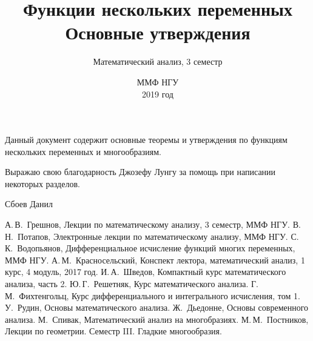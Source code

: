 \documentclass[oneside, final]{book}
\title{\textbf{Функции нескольких переменных}\\ Основные утверждения}
\author{Математический анализ, 3 семестр}
\date{ММФ НГУ\\ \vfill2019 год}
\theoremstyle{plain}
\theoremstyle{definition}
\begin{document}
	\maketitle
	
	\thispagestyle{empty}
	\vfill 
		Данный документ содержит основные теоремы и утверждения по функциям нескольких переменных и многообразиям.
		
		Выражаю свою благодарность Джозефу Лунгу за помощь при написании некоторых разделов.
		
	\vfill
	\hfill Сбоев Данил
	\vfill
	\newpage
	\thispagestyle{empty}
	\tableofcontents
	
	

	
		
	
	
	\begin{thebibliography}{0}
		 А.\,В.~Грешнов, Лекции по математическому анализу, 3 семестр, ММФ НГУ.
		 В.\,Н.~Потапов, Электронные лекции по математическому анализу, ММФ НГУ.
		 С.\,К.~Водопьянов, Дифференциальное исчисление функций многих переменных, ММФ НГУ.
		 А.\,М.~Красносельский, Конспект лектора, математический анализ, 1 курс, 4 модуль, 2017 год. 
		 И.\,А.~Шведов, Компактный курс математического анализа, часть 2.
		 Ю.\,Г.~Решетняк, Курс математического анализа.
		 Г.\,М.~Фихтенгольц, Курс дифференциального и интегрального исчисления, том 1.
		 У.~Рудин, Основы математического анализа.
		 Ж.~Дьедонне, Основы современного анализа.
		 М.~Спивак, Математический анализ на многобразиях.
		 М.\,М.~Постников, Лекции по геометрии. Семестр III. Гладкие многообразия.
	\end{thebibliography}
\end{document}
